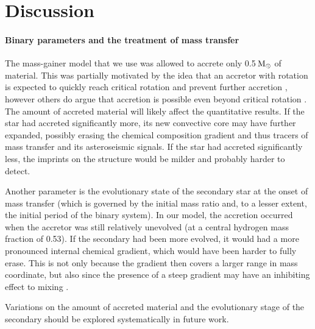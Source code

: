 \documentclass[desactivate]{aa}
\begin{document}
\section{Discussion}
\label{sec:caveats}

\paragraph{Binary parameters and the treatment of mass transfer} The mass-gainer model that we use was allowed to accrete only 0.5$\,{\rm M_\odot}$ of material. This was partially motivated by the idea that an accretor with rotation is expected to quickly reach critical rotation and prevent further accretion \citep[e.g.][]{Petrovic+2005}, however others do argue that accretion is possible even beyond critical rotation \citep{Popham+1991, Paczynski+1991}. The amount of accreted material will likely affect the quantitative results. If the star had accreted significantly more, its new convective core may have further expanded, possibly erasing the chemical composition gradient and thus tracers of mass transfer and its asteroseismic signals. If the star had accreted significantly less, the imprints on the structure would be milder and probably harder to detect.  

Another parameter is the evolutionary state of the secondary star at the onset of mass transfer (which is governed by the initial mass ratio and, to a lesser extent, the initial period of the binary system). In our model, the accretion occurred when the accretor was still relatively unevolved (at a central hydrogen mass fraction of 0.53). If the secondary had been more evolved, it would had a more pronounced internal chemical gradient, which would have been harder to fully erase. This is not only because the gradient then covers a larger range in mass coordinate, but also since the presence of a steep gradient may have an inhibiting effect to mixing \citep{Braun+1995}. 

Variations on the amount of accreted material and the evolutionary stage of the secondary should be explored systematically in future work. 

\newpage

\end{document}
